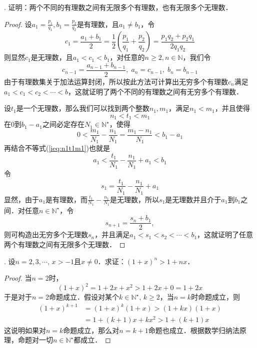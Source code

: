 . 证明：两个不同的有理数之间有无限多个有理数，也有无限多个无理数．
\begin{proof}
设$\displaystyle a_1 = \frac{p_1}{q_1}, b_1 = \frac{p_2}{q_2}$是有理数，且$a_1 \neq b_1$，令
\begin{equation}
    c_1 = \frac{a_1+b_1}{2} = \frac{1}{2} \left( \frac{p_1}{q_1} + \frac{p_2}{q_2} \right) = \frac{p_1 q_2 + p_2 q_1}{2 q_1 q_2}
\end{equation}
则显然$c_1$是无理数，且$a_1 < c_1 < b_1$，对任意的$n\geq 2, n \in \mathbb{N}$，我们令
\begin{equation}
    c_{n-1} = \frac{a_{n-1}+b_{n-1}}{2}, \; a_n = c_{n-1}, \; b_n = b_{n-1}
\end{equation}
由于有理数集关于加法运算封闭，所以按此方法可计算出无穷多个有理数$c_n$满足$a_1 < c_1 < c_2 < \cdots < b$，这就证明了两个不同的有理数之间有无穷多个有理数．

\noindent 设$t_1$是一个无理数，那么我们可以找到两个整数$n_1, m_1$，满足$n_1 < m_1$，并且使得
\begin{equation}
    n_1 < t_1 < m_1
    \label{ieq:n1t1m1}
\end{equation}
在$0$到$b_1 - a_1$之间必定存在$N_1 \in \mathbb{N}^\star$，使得
\begin{equation}
    0 < \frac{m_1}{N_1} - \frac{n_1}{N_1} = \frac{m_1-n_1}{N_1} < b_1 - a_1
\end{equation}
再结合不等式(\ref{ieq:n1t1m1})也就是
\begin{equation}
    a_1 < \frac{t_1}{N_1} - \frac{n_1}{N_1} + a_1 < b_1
\end{equation}
令
\begin{equation}
    s_1 = \frac{t_1}{N_1} - \frac{n_1}{N_1} + a_1
\end{equation}
显然，由于$a_1$是有理数，而$\displaystyle \frac{t_1}{N_1} - \frac{n_1}{N_1}$是无理数，所以$s_1$是无理数并且介于$a_1$到$b_1$之间．对任意$n \in \mathbb{N}^\star$，令
\begin{equation}
    s_{n+1} = \frac{s_n+b_1}{2}, 
\end{equation}
则可构造出无穷多个无理数$s_{n}$，并且满足$a_1 < s_1 < s_2 < \cdots < b_1$，这就证明了任意两个有理数之间有无限多个无理数．
\end{proof}

. 设$n=2,3,\cdots, \, x > -1$且$x\neq 0$．求证：$(1+x)^n > 1+nx$．
\begin{proof}
当$n=2$时，
\begin{equation}
    (1+x)^2 = 1 + 2x + x^2 > 1 + 2x + 0 = 1 + 2x
\end{equation}
于是对于$n=2$命题成立．假设对某个$k \in \mathbb{N}^\star, \, k \geq 2$，当$n=k$时命题成立，则
\begin{align}
    (1+x)^{k+1} &= (1+x)^k (1+x) > (1+kx)(1+x) \\
    &= 1 + (k+1)x + kx^2 > 1+(k+1)x
\end{align}
这说明如果对$n=k$命题成立，那么对$n=k+1$命题也成立．根据数学归纳法原理，命题对一切$n\in\mathbb{N}^\star$都成立．
\end{proof}

